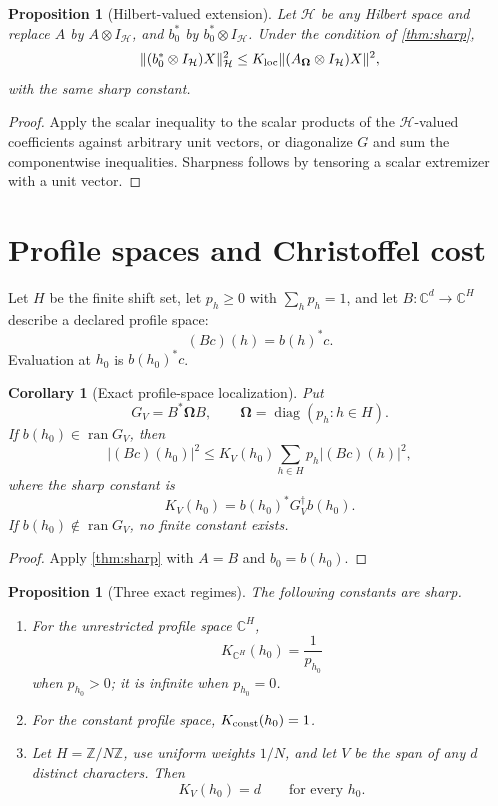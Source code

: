 \documentclass[11pt]{article}
\newtheorem{proposition}[theorem]{Proposition}
\newtheorem{corollary}[theorem]{Corollary}
\theoremstyle{definition}
\theoremstyle{remark}
\newcommand{\C}{\mathbb C}
\newcommand{\Om}{\boldsymbol\Omega}
\begin{document}
\begin{proposition}[Hilbert-valued extension]
\label{prop:vector}
Let \(\mathcal H\) be any Hilbert space and replace \(A\) by
\(A\otimes I_{\mathcal H}\), and \(b_0^*\) by
\(b_0^*\otimes I_{\mathcal H}\).  Under the condition of
\cref{thm:sharp},
\[
 \|(b_0^*\otimes I_{\mathcal H})X\|_{\mathcal H}^2
 \le K_{\rm loc}
 \|(A_{\Om}\otimes I_{\mathcal H})X\|^2,
\]
with the same sharp constant.
\end{proposition}

\begin{proof}
Apply the scalar inequality to the scalar products of the
\(\mathcal H\)-valued coefficients against arbitrary unit vectors,
or diagonalize \(G\) and sum the componentwise inequalities.
Sharpness follows by tensoring a scalar extremizer with a unit vector.
\end{proof}

\section{Profile spaces and Christoffel cost}

Let \(H\) be the finite shift set, let \(p_h\ge0\) with
\(\sum_hp_h=1\), and let \(B:\C^d\to\C^H\) describe a declared
profile space:
\[
 (Bc)(h)=b(h)^*c.
\]
Evaluation at \(h_0\) is \(b(h_0)^*c\).

\begin{corollary}[Exact profile-space localization]
\label{cor:profile}
Put
\[
 G_V=B^*\Om B,\qquad
 \Om=\operatorname{diag}(p_h:h\in H).
\]
If \(b(h_0)\in\operatorname{ran}G_V\), then
\[
 |(Bc)(h_0)|^2
 \le K_V(h_0)\sum_{h\in H}p_h|(Bc)(h)|^2,
\]
where the sharp constant is
\[
 \boxed{\quad
 K_V(h_0)=b(h_0)^*G_V^\dagger b(h_0).
 \quad}
\]
If \(b(h_0)\notin\operatorname{ran}G_V\), no finite constant exists.
\end{corollary}

\begin{proof}
Apply \cref{thm:sharp} with \(A=B\) and \(b_0=b(h_0)\).
\end{proof}

\begin{proposition}[Three exact regimes]
\label{prop:regimes}
The following constants are sharp.
\begin{enumerate}[label=(\roman*),leftmargin=2em]
\item For the unrestricted profile space \(\C^H\),
\[
 K_{\C^H}(h_0)=\frac1{p_{h_0}}
 \]
when \(p_{h_0}>0\); it is infinite when \(p_{h_0}=0\).
\item For the constant profile space, \(K_{\rm const}(h_0)=1\).
\item Let \(H=\mathbb Z/N\mathbb Z\), use uniform weights \(1/N\),
and let \(V\) be the span of any \(d\) distinct characters.  Then
\[
 K_V(h_0)=d
 \qquad\text{for every }h_0.
\]
\end{enumerate}
\end{proposition}
\end{document}
